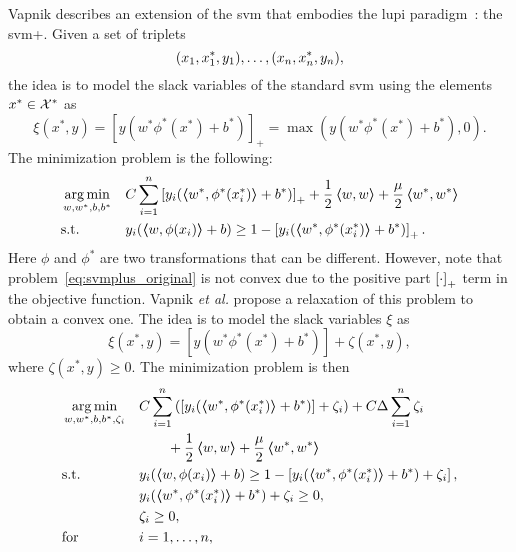 Vapnik describes an extension of the \acrshort{svm} that embodies the \acrshort{lupi} paradigm~\citep{VapnikV09,VapnikI15a}: the \acrshort{svm}+. Given a set of triplets
\begin{equation}
    \nonumber
    (x_1, x^*_1, y_1), \ldots, (x_n, x^*_n, y_n) ,
\end{equation}
the idea is to model the slack variables of the standard \acrshort{svm} using the elements $x^* \in \mathcal{X}^*$ as
$$ \xi(x^*, y) = \left[y (w^* \phi^*(x^*) + b^*) \right]_+  = \max\left( y (w^* \phi^*(x^*) + b^*), 0  \right).$$
The minimization problem is the following:
\begin{equation}
    \label{eq:svmplus_original}
    \begin{aligned}
        & \argmin_{w, w^*, b, b^*}
        & &  C \sum_{i=1}^\nsamples \left[y_i (\dotp{w^*}{\phi^*(x_i^*)} + b^*) \right]_+ + \frac{1}{2} \dotp{w}{w} + \frac{\mu}{2} \dotp{w^*}{w^*} \\
        & \text{s.t.}
        & & y_{i} ( \dotp{w}{\phi(x_{i})} + b) \geq 1 - \left[y_i (\dotp{w^*}{\phi^*(x^*_i)} + b^*) \right]_+ .
    \end{aligned}
\end{equation}
Here $\phi$ and $\phi^*$ are two transformations that can be different.
However, note that problem~\eqref{eq:svmplus_original} is not convex due to the positive part $\left[\cdot\right]_{+}$ term in the objective function. Vapnik \emph{et al.} propose a relaxation of this problem to obtain a convex one. The idea is to model the slack variables $\xi$ as
$$ \xi(x^*, y) = \left[y (w^* \phi^*(x^*) + b^*) \right] + \zeta(x^*, y) ,$$
where $\zeta(x^*, y) \geq 0$.
The minimization problem is then
\begin{equation}
    \label{eq:svmplus_delta_primal}
    \begin{aligned}
        & \argmin_{w, w^*, b, b^*, \zeta_i}
        & &  C \sum_{i=1}^\nsamples \left( \left[y_i (\dotp{w^*}{\phi^*(x_i^*)} + b^*) \right] + \zeta_i \right) + C \Delta \sum_{i=1}^\nsamples \zeta_i \\
        & & &\qquad + \frac{1}{2} \dotp{w}{w} + \frac{\mu}{2} \dotp{w^*}{w^*} \\
        & \text{s.t.}
        & & y_{i} ( \dotp{w}{\phi(x_{i})} + b) \geq 1 - \left[y_i (\dotp{w^*}{\phi^*(x^*_i)} + b^*) + \zeta_i \right] ,\\
        & & &y_i (\dotp{w^*}{\phi^*(x^*_i)} + b^*) + \zeta_i \geq 0 ,\\
        & & &\zeta_i \geq 0, \\
        & \text{for } & & i=1, \ldots, \nsamples,
    \end{aligned}
\end{equation}
